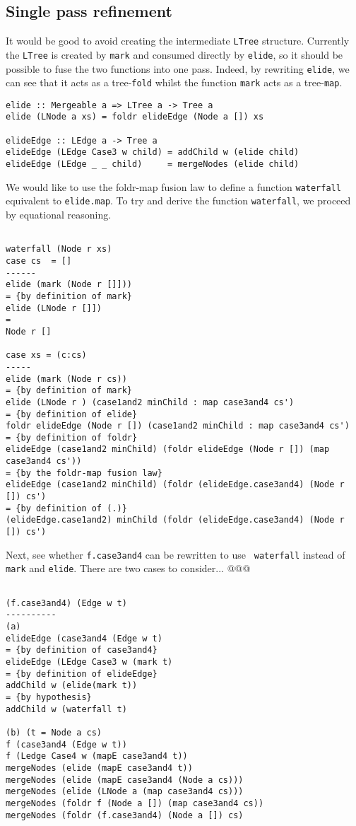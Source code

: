 \documentclass{jfp}
\begin{document}
\subsection{Single pass refinement}

It would be good to avoid creating the intermediate {\tt LTree}
structure. Currently the {\tt LTree} is created by {\tt mark} and
consumed directly by {\tt elide}, so it should be possible to fuse the
two functions into one pass.  Indeed, by rewriting {\tt elide}, we can
see that it acts as a tree-{\tt fold} whilst the function {\tt mark} acts as a
tree-{\tt map}.

\begin{verbatim}
elide :: Mergeable a => LTree a -> Tree a
elide (LNode a xs) = foldr elideEdge (Node a []) xs

elideEdge :: LEdge a -> Tree a
elideEdge (LEdge Case3 w child) = addChild w (elide child)
elideEdge (LEdge _ _ child)     = mergeNodes (elide child)
\end{verbatim}

We would like to use the foldr-map fusion law to define a function
{\tt waterfall} equivalent to {\tt elide.map}.
To try and derive the function {\tt waterfall}, we proceed by equational
reasoning.

\begin{verbatim}

waterfall (Node r xs)
case cs  = []
------
elide (mark (Node r []]))
= {by definition of mark}
elide (LNode r []])
=
Node r []

case xs = (c:cs)
-----
elide (mark (Node r cs))
= {by definition of mark}
elide (LNode r ) (case1and2 minChild : map case3and4 cs')
= {by definition of elide}
foldr elideEdge (Node r []) (case1and2 minChild : map case3and4 cs')
= {by definition of foldr}
elideEdge (case1and2 minChild) (foldr elideEdge (Node r []) (map case3and4 cs'))
= {by the foldr-map fusion law}
elideEdge (case1and2 minChild) (foldr (elideEdge.case3and4) (Node r []) cs')
= {by definition of (.)}
(elideEdge.case1and2) minChild (foldr (elideEdge.case3and4) (Node r []) cs')
\end{verbatim}

Next, see whether {\tt f.case3and4} can be rewritten to use {\tt
waterfall} instead of {\tt mark} and {\tt elide}.
There are two cases to consider... @@@
\begin{verbatim}

(f.case3and4) (Edge w t)
----------
(a)
elideEdge (case3and4 (Edge w t)
= {by definition of case3and4}
elideEdge (LEdge Case3 w (mark t)
= {by definition of elideEdge}
addChild w (elide(mark t))
= {by hypothesis}
addChild w (waterfall t)

(b) (t = Node a cs)
f (case3and4 (Edge w t))
f (Ledge Case4 w (mapE case3and4 t))
mergeNodes (elide (mapE case3and4 t))
mergeNodes (elide (mapE case3and4 (Node a cs)))
mergeNodes (elide (LNode a (map case3and4 cs)))
mergeNodes (foldr f (Node a []) (map case3and4 cs))
mergeNodes (foldr (f.case3and4) (Node a []) cs)

\end{verbatim}
\end{document}
